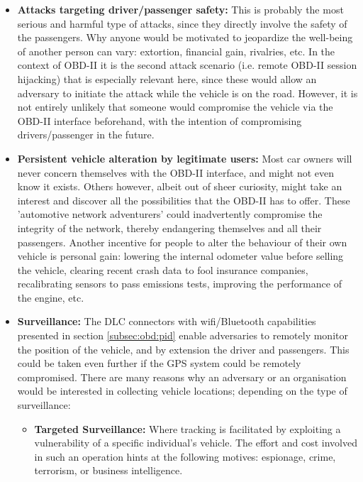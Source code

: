 \begin{itemize}
	\item \textbf{Attacks targeting driver/passenger safety:} This is probably the most serious and harmful type of attacks, since they directly involve the safety of the passengers. Why anyone would be motivated to jeopardize the well-being of another person can vary: extortion, financial gain, rivalries, etc. In the context of OBD-II it is the second attack scenario (i.e. remote OBD-II session hijacking) that is especially relevant here, since these would allow an adversary to initiate the attack while the vehicle is on the road. However, it is not entirely unlikely that someone would compromise the vehicle via the OBD-II interface beforehand, with the intention of compromising drivers/passenger in the future.
	
	
	\item \textbf{Persistent vehicle alteration by legitimate users:} Most car owners will never concern themselves with the OBD-II interface, and might not even know it exists. Others however, albeit out of sheer curiosity, might take an interest and discover all the possibilities that the OBD-II has to offer. These 'automotive network adventurers' could inadvertently compromise the integrity of the network, thereby endangering themselves and all their passengers. Another incentive for people to alter the behaviour of their own vehicle is personal gain: lowering the internal odometer value before selling the vehicle, clearing recent crash data to fool insurance companies, recalibrating sensors to pass emissions tests, improving the performance of the engine, etc.  
	
	\item \textbf{Surveillance:} The DLC connectors with wifi/Bluetooth capabilities presented in section \ref{subsec:obd:pid} enable adversaries to remotely monitor the position of the vehicle, and by extension the driver and passengers. This could be taken even further if the GPS system could be remotely compromised. There are many reasons why an adversary or an organisation would be interested in collecting vehicle locations; depending on the type of surveillance: 
	\begin{itemize}
		\item \textbf{Targeted Surveillance:} Where tracking is facilitated by exploiting a vulnerability of a specific individual's vehicle. The effort and cost involved in such an operation hints at the following motives: espionage, crime, terrorism, or business intelligence.
		

\end{itemize}
\end{itemize}
